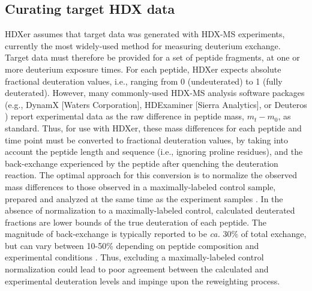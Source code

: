 \documentclass[9pt,tutorial]{livecoms}
\begin{document}
\subsection{Curating target HDX data}
HDXer assumes that target data was generated with HDX-MS experiments, currently the most widely-used method for measuring deuterium exchange.
Target data must therefore be provided for a set of peptide fragments, at one or more deuterium exposure times. 
For each peptide, HDXer expects absolute fractional deuteration values, i.e., ranging from 0 (undeuterated) to 1 (fully deuterated).
However, many commonly-used HDX-MS analysis software packages (e.g., DynamX [Waters Corporation], HDExaminer [Sierra Analytics], or Deuteros \cite{Lau2021}) report experimental data as the raw difference in peptide mass, $m_t - m_0$, as standard.
Thus, for use with HDXer, these mass differences for each peptide and time point must be converted to fractional deuteration values, by taking into account the peptide length and sequence (i.e., ignoring proline residues), and the back-exchange experienced by the peptide after quenching the deuteration reaction.
The optimal approach for this conversion is to normalize the observed mass differences to those observed in a maximally-labeled control sample, prepared and analyzed at the same time as the experiment samples \cite{Masson2019}.
In the absence of normalization to a maximally-labeled control, calculated deuterated fractions are lower bounds of the true deuteration of each peptide.
The magnitude of back-exchange is typically reported to be \textit{ca.} 30\% of total exchange, but can vary between 10-50\% depending on peptide composition and experimental conditions \cite{Walters2012}.
Thus, excluding a maximally-labeled control normalization could lead to poor agreement between the calculated and experimental deuteration levels and impinge upon the reweighting process.
\end{document}
